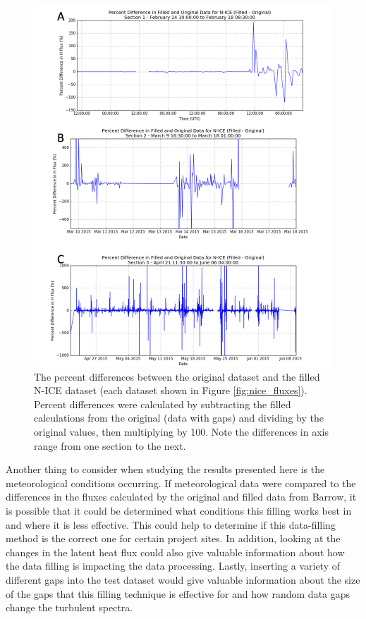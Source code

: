   \begin{figure}[h]
    \centering
    \includegraphics[width=1\linewidth]{figures/appendixb/percent_diff.png}
    \caption[N-ICE percent differences between filled and unfilled datasets.]{The percent differences between the original dataset and the filled N-ICE dataset (each dataset shown in Figure \ref{fig:nice_fluxes}). Percent differences were calculated by subtracting the filled calculations from the original (data with gaps) and dividing by the original values, then multiplying by 100. Note the differences in axis range from one section to the next.}
    \label{fig:percent_diff}
\end{figure}

Another thing to consider when studying the results presented here is the meteorological conditions occurring. If meteorological data were compared to the differences in the fluxes calculated by the original and filled data from Barrow, it is possible that it could be determined what conditions this filling works best in and where it is less effective. This could help to determine if this data-filling method is the correct one for certain project sites. In addition, looking at the changes in the latent heat flux could also give valuable information about how the data filling is impacting the data processing. Lastly, inserting a variety of different gaps into the test dataset would give valuable information about the size of the gaps that this filling technique is effective for and how random data gaps change the turbulent spectra. 

